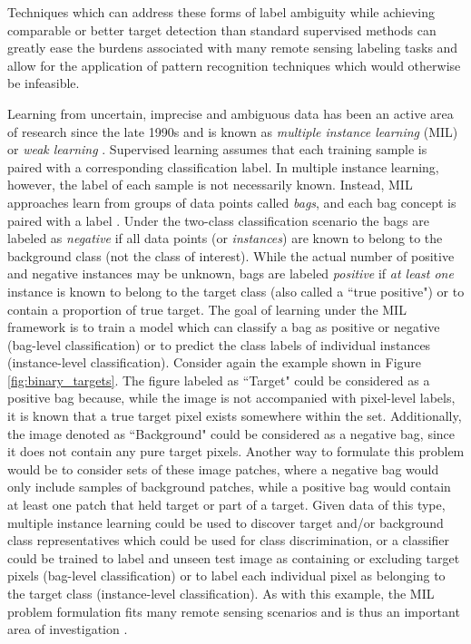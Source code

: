 Techniques which can address these forms of label ambiguity while achieving comparable or better target detection than standard supervised methods can greatly ease the burdens associated with many remote sensing labeling tasks and allow for the application of pattern recognition techniques which would otherwise be infeasible.

Learning from uncertain, imprecise and ambiguous data has been an active area of research since the late 1990s and is known as \textit{multiple instance learning} (MIL) or \textit{weak learning} \citep{Bocinsky2019Thesis}.  Supervised learning assumes that each training sample is paired with a corresponding classification label.  In multiple instance learning, however, the label of each sample is not necessarily known.  Instead, MIL approaches learn from groups of data points called \textit{bags}, and each bag concept is paired with a label \citep{Cook2015Thesis}. Under the two-class classification scenario the bags are labeled as \textit{negative} if all data points (or \textit{instances}) are known to belong to the background class (not the class of interest).  While the actual number of positive and negative instances may be unknown, bags are labeled \textit{positive} if \textit{at least one} instance is known to belong to the target class (also called a ``true positive") \citep{Zare2016MIACE} or to contain a proportion of true target.  The goal of learning under the MIL framework is to train a model which can classify a bag as positive or negative (bag-level classification) or to predict the class labels of individual instances (instance-level classification). Consider again the example shown in Figure \ref{fig:binary_targets}.  The figure labeled as ``Target" could be considered as a positive bag because, while the image is not accompanied with pixel-level labels, it is known that a true target pixel exists somewhere within the set.  Additionally, the image denoted as ``Background" could be considered as a negative bag, since it does not contain any pure target pixels. Another way to formulate this problem would be to consider sets of these image patches, where a negative bag would only include samples of background patches, while a positive bag would contain at least one patch that held target or part of a target. Given data of this type, multiple instance learning could be used to discover target and/or background class representatives which could be used for class discrimination, or a classifier could be trained to label and unseen test image as containing or excluding target pixels (bag-level classification) or to label each individual pixel as belonging to the target class (instance-level classification).  As with this example, the MIL problem formulation fits many remote sensing scenarios and is thus an important area of investigation \citep{Du2017Thesis}.  

